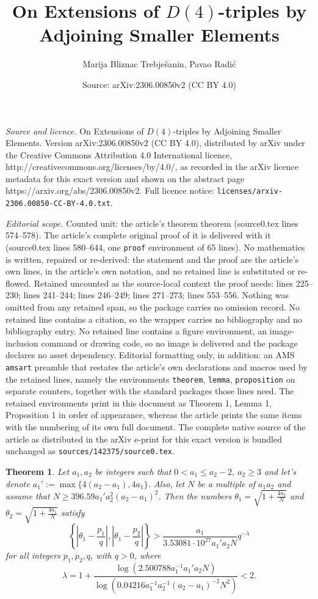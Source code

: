 \documentclass[10pt,a4paper]{amsart}
\title{On Extensions of $D(4)$-triples by Adjoining Smaller Elements}
\author{Marija Bliznac Trebje\v{s}anin, Pavao Radi\'c}
\date{Source: arXiv:2306.00850v2 (CC BY 4.0)}
\newtheorem{theorem}{Theorem}
\begin{document}
\maketitle

\noindent\emph{Source and licence.} On Extensions of $D(4)$-triples by Adjoining Smaller Elements. Version arXiv:2306.00850v2 (CC BY 4.0), distributed by arXiv under the Creative Commons Attribution 4.0 International licence, http://creativecommons.org/licenses/by/4.0/, as recorded in the arXiv licence metadata for this exact version and shown on the abstract page https://arxiv.org/abs/2306.00850v2. Full licence notice: \texttt{licenses/arxiv-2306.00850-CC-BY-4.0.txt}.\par\smallskip

\noindent\textit{Editorial scope.} Counted unit: the article's theorem theorem (source0.tex lines 574--578). The article's complete original proof of it is delivered with it (source0.tex lines 580--644, one \texttt{proof} environment of 65 lines). No mathematics is written, repaired or re-derived: the statement and the proof are the article's own lines, in the article's own notation, and no retained line is substituted or re-flowed.  Retained uncounted as the source-local context the proof needs: lines 225--230; lines 241--244; lines 246--249; lines 271--273; lines 553--556.  Nothing was omitted from any retained span, so the package carries no omission record.  No retained line contains a citation, so the wrapper carries no bibliography and no bibliography entry.  No retained line contains a figure environment, an image-inclusion command or drawing code, so no image is delivered and the package declares no asset dependency.  Editorial formatting only, in addition: an AMS \texttt{amsart} preamble that restates the article's own declarations and macros used by the retained lines, namely the environments \texttt{theorem}, \texttt{lemma}, \texttt{proposition} on separate counters, together with the standard packages those lines need.  The retained environments print in this document as Theorem 1, Lemma 1, Proposition 1 in order of appearance, whereas the article prints the same items with the numbering of its own full document.  The complete native source of the article as distributed in the arXiv e-print for this exact version is bundled unchanged as \texttt{sources/142375/source0.tex}.
\begin{theorem}\label{tm: gornje_ograde}
Let $a_1,a_2$ be integers such that $0<a_1 \leq a_2-2,\ a_2 \geq 3$ and let's denote $a_1' := \max\{4(a_2-a_1),4a_1\}$. Also, let $N$ be a multiple of $a_1a_2$ and assume that $N \geq 396.59a_1'a_2^2(a_2-a_1)^2$. Then the numbers $\theta_1 = \sqrt{1+\frac{4a_2}{N}}$ and $\theta_2 = \sqrt{1+\frac{4a_1}{N}}$ satisfy
$$ \left\{ \left| \theta_1-\frac{p_1}{q} \right| , \left|\theta_1-\frac{p_2}{q} \right|     \right\} > \frac{a_1}{3.53081 \cdot 10^{27} a_1'a_2N}q^{-\lambda}$$
for all integers $p_1,p_2,q$, with $q>0$, where 
\[\lambda=1+\frac{\log(2.500788a_1^{-1}a_1'a_2N)}{\log(0.04216a_1^{-1}a_2^{-1}(a_2-a_1)^{-2}N^2)}<2.\]
\end{theorem}
\end{document}
